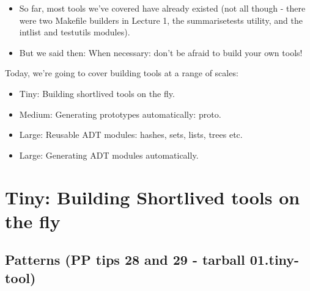 \documentclass[handout,]{beamer}
\newcommand{\pitem}{\pause \item}
\begin{document}
\begin{frame}[fragile]
    \begin{itemize}
      \item
      So far, most tools we've covered have already existed (not all though -
      there were two Makefile builders in Lecture 1, the
      summarisetests utility, and the intlist and testutils modules).
    \pitem
      But we said then: \alert{When necessary: don't be afraid to build your
      own tools!}
    \end{itemize}

    \pause
    Today, we're going to cover building tools at a range of scales:

    \begin{itemize}
      \item
        Tiny: Building \alert{shortlived tools on the fly}.
      \pitem
        Medium: \alert{Generating prototypes automatically: proto}.
      \pitem
        Large: \alert{Reusable ADT modules}: hashes, sets, lists, trees etc.
      \pitem
        Large: Generating \alert{ADT modules} automatically.
    \end{itemize}
\end{frame}

\section{Tiny: Building Shortlived tools on the fly}
\subsection{Patterns (PP tips 28 and 29 - tarball 01.tiny-tool)}
\end{document}
